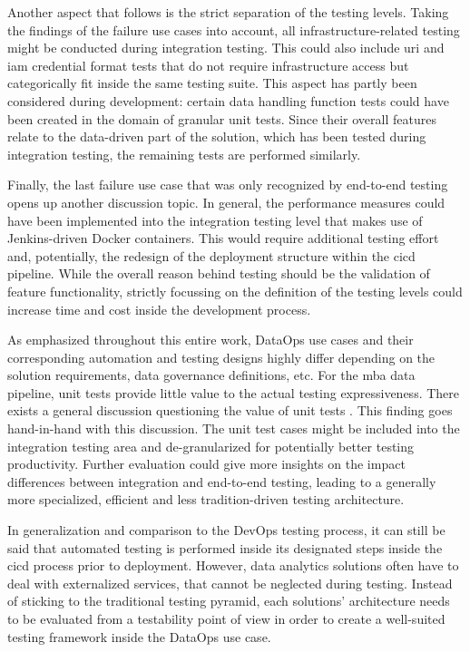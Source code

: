 Another aspect that follows is the strict separation of the testing levels. Taking the findings of the failure use cases into account, all infrastructure-related testing might be conducted during integration testing. This could also include \acs{uri} and \acs{iam} credential format tests that do not require infrastructure access but categorically fit inside the same testing suite. This aspect has partly been considered during development: certain data handling function tests could have been created in the domain of granular unit tests. Since their overall features relate to the data-driven part of the solution, which has been tested during integration testing, the remaining tests are performed similarly.

Finally, the last failure use case that was only recognized by end-to-end testing opens up another discussion topic. In general, the performance measures could have been implemented into the integration testing level that makes use of Jenkins-driven Docker containers. This would require additional testing effort and, potentially, the redesign of the deployment structure within the \ac{cicd} pipeline. While the overall reason behind testing should be the validation of feature functionality, strictly focussing on the definition of the testing levels could increase time and cost inside the development process.

As emphasized throughout this entire work, DataOps use cases and their corresponding automation and testing designs highly differ depending on the solution requirements, data governance definitions, etc. For the \ac{mba} data pipeline, unit tests provide little value to the actual testing expressiveness. There exists a general discussion questioning the value of unit tests \cite{Coplien}\cite{Golub2020}. This finding goes hand-in-hand with this discussion. The unit test cases might be included into the integration testing area and de-granularized for potentially better testing productivity. Further evaluation could give more insights on the impact differences between integration and end-to-end testing, leading to a generally more specialized, efficient and less tradition-driven testing architecture.

In generalization and comparison to the DevOps testing process, it can still be said that automated testing is performed inside its designated steps inside the \ac{cicd} process prior to deployment. However, data analytics solutions often have to deal with externalized services, that cannot be neglected during testing. Instead of sticking to the traditional testing pyramid, each solutions' architecture needs to be evaluated from a testability point of view in order to create a well-suited testing framework inside the DataOps use case.



